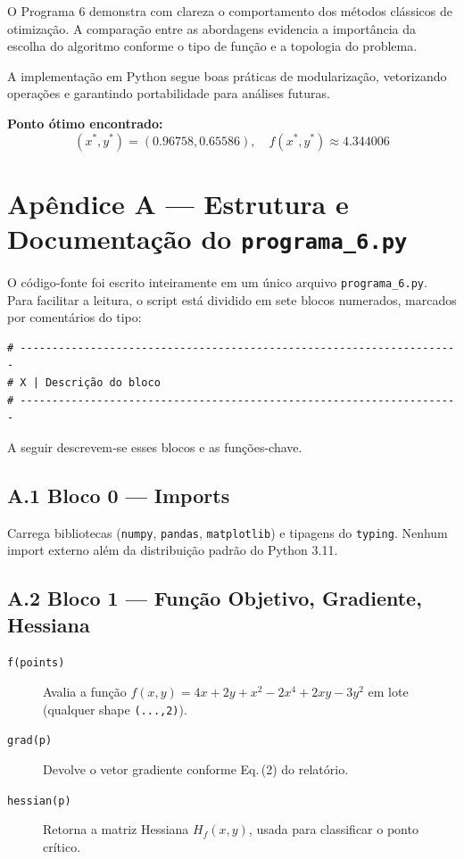 \documentclass[12pt]{article}
\begin{document}
O Programa 6 demonstra com clareza o comportamento dos métodos clássicos de otimização. A comparação entre as abordagens evidencia a importância da escolha do algoritmo conforme o tipo de função e a topologia do problema.

A implementação em Python segue boas práticas de modularização, vetorizando operações e garantindo portabilidade para análises futuras.

\vspace{1em}
\noindent\textbf{Ponto ótimo encontrado:}
\begin{equation*}
    (x^*, y^*) = (0.96758, 0.65586), \quad f(x^*, y^*) \approx 4.344006
\end{equation*}

\appendix
\section*{Apêndice A — Estrutura e Documentação do \texttt{programa\_6.py}}

O código‐fonte foi escrito inteiramente em um único arquivo \texttt{programa\_6.py}.  
Para facilitar a leitura, o script está dividido em sete blocos numerados,
marcados por comentários do tipo:
\begin{verbatim}
# ---------------------------------------------------------------------
# X | Descrição do bloco
# ---------------------------------------------------------------------
\end{verbatim}

A seguir descrevem‐se esses blocos e as funções-chave.

\subsection*{A.1 Bloco 0 — Imports}
Carrega bibliotecas (\texttt{numpy}, \texttt{pandas}, \texttt{matplotlib}) e tipagens
do \texttt{typing}.  
Nenhum import externo além da distribuição padrão do Python 3.11.

\subsection*{A.2 Bloco 1 — Função Objetivo, Gradiente, Hessiana}
\begin{description}
  \item[\texttt{f(points)}] Avalia a função
        $f(x,y)=4x+2y+x^2-2x^4+2xy-3y^2$ em lote (qualquer shape \texttt{(...,2)}).
  \item[\texttt{grad(p)}] Devolve o vetor gradiente conforme Eq.\,(2) do relatório.
  \item[\texttt{hessian(p)}] Retorna a matriz Hessiana $H_f(x,y)$, usada para
        classificar o ponto crítico.
\end{description}
\end{document}
